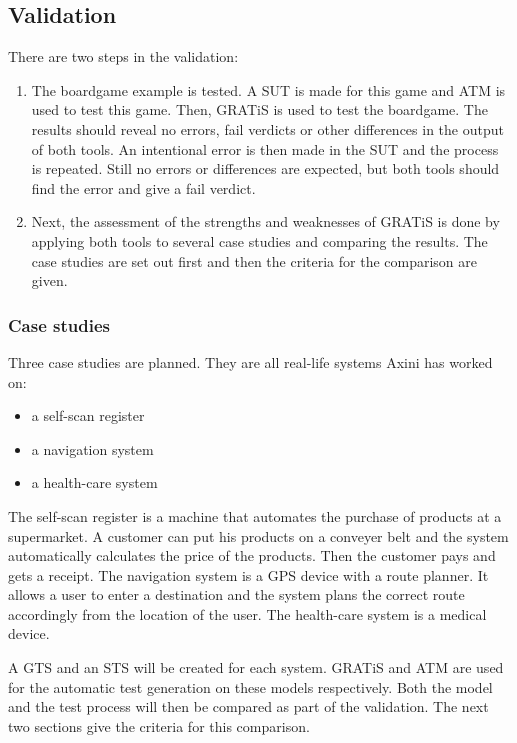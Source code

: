 \subsection{Validation}\label{sec:research_methods_validation}
There are two steps in the validation:
\begin{enumerate}
  \item The boardgame example is tested. A SUT is made for this game and ATM is used to test this game. Then, GRATiS is used to test the boardgame. The results should reveal no errors, fail verdicts or other differences in the output of both tools. An intentional error is then made in the SUT and the process is repeated. Still no errors or differences are expected, but both tools should find the error and give a fail verdict.
  \item Next, the assessment of the strengths and weaknesses of GRATiS is done by applying both tools to several case studies and comparing the results. The case studies are set out first and then the criteria for the comparison are given.
\end{enumerate}

\subsubsection{Case studies}
Three case studies are planned. They are all real-life systems Axini has worked on:
\begin{itemize}
  \item a self-scan register
  \item a navigation system
  \item a health-care system
\end{itemize}  

The self-scan register is a machine that automates the purchase of products at a supermarket. A customer can put his products on a conveyer belt and the system automatically calculates the price of the products. Then the customer pays and gets a receipt. The navigation system is a GPS device with a route planner. It allows a user to enter a destination and the system plans the correct route accordingly from the location of the user. The health-care system is a medical device.

A GTS and an STS will be created for each system. GRATiS and ATM are used for the automatic test generation on these models respectively. Both the model and the test process will then be compared as part of the validation. The next two sections give the criteria for this comparison.

